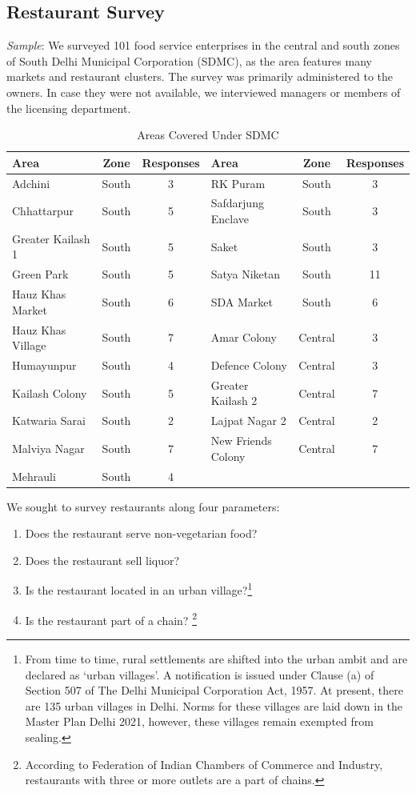 \documentclass[a4paper, 12pt, twoside]{article}
\begin{document}
		\subsection* {Restaurant Survey}
		\textit{Sample}: We surveyed 101 food service enterprises in the central and south zones of South Delhi Municipal Corporation (SDMC), as the area features many markets and restaurant clusters. The survey was primarily administered to the owners. In 
case they were not available, we interviewed managers or members of the licensing department.

		\begin{table}[H]
			\caption{Areas Covered Under SDMC}
			\begin{tabular}{ l  c  c l   c  c}
			\toprule
			Area & Zone & Responses & Area & Zone & Responses \\
			\midrule
				Adchini 			&	South		&	3				&	RK Puram			&	South	&	3	\\
				Chhattarpur		&	South		&	5				&	Safdarjung Enclave	&	South	&	3	\\
				Greater Kailash 1	&	South		&	5				&	Saket			&	South	&	3	\\
				Green Park		&	South		&	5				&	Satya Niketan		&	South	&	11	\\
				Hauz Khas Market	&	South		&	6				&	SDA Market		&	South	&	6	\\
				Hauz Khas Village	&	South		&	7				&	Amar Colony		&	Central	&	3	\\
				Humayunpur		&	South		&	4				&	Defence Colony	&	Central	&	3	\\
				Kailash Colony		&	South		&	5				&	Greater Kailash 2	&	Central	&	7	\\
				Katwaria Sarai		&	South		&	2				&	Lajpat Nagar 2		&	Central	&	2	\\
				Malviya Nagar		&	South		&	7				&	New Friends Colony	&	Central	&	7	\\
				Mehrauli			&	South		&	4	\\	
				\bottomrule					
			\end{tabular}
		\end{table}    
   		
		
		
		
		We sought to survey restaurants along four parameters:
		\begin{enumerate}[nosep]
			\item Does the restaurant serve non-vegetarian food?
			\item Does the restaurant sell liquor?
			\item Is the restaurant located in an urban village?\footnote{From time to time, rural settlements are shifted into the urban ambit and are declared as ‘urban villages’. A notification is issued under Clause (a) of Section 507 of The Delhi Municipal 
Corporation Act, 1957. At present, there are 135 urban villages in Delhi. Norms for these villages are laid down in the Master Plan Delhi 2021, however, these villages remain exempted from sealing.} 
			\item Is the restaurant part of a chain? \footnote{According to Federation of Indian Chambers of Commerce and Industry, restaurants with three or more outlets are a part of chains.}
		\end{enumerate}
\end{document}
